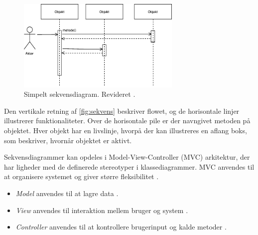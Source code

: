 \begin{figure} [H]
\centering
\includegraphics[width=0.7\textwidth]{figures/sekvens}
\caption{Simpelt sekvensdiagram. Revideret \cite{Brahma2015}.}
\label{fig:sekvens}
\end{figure}

\noindent
Den vertikale retning af \autoref{fig:sekvens} beskriver flowet, og de horisontale linjer illustrerer funktionaliteter. Over de horisontale pile er der navngivet metoden på objektet. Hver objekt har en livslinje, hvorpå der kan illustreres en aflang boks, som beskriver, hvornår objektet er aktivt. \cite{Brahma2015}

Sekvensdiagrammer kan opdeles i Model-View-Controller (MVC) arkitektur, der har ligheder med de definerede stereotyper i klassediagrammer. MVC anvendes til at organisere systemet og giver større fleksibilitet \cite{Brahma2015}. 

\begin{itemize}
\item \textit{Model} anvendes til at lagre data \cite{Brahma2015}.
\item \textit{View} anvendes til interaktion mellem bruger og system \cite{Brahma2015}.
\item \textit{Controller} anvendes til at kontrollere brugerinput og kalde metoder \cite{Brahma2015}.
\end{itemize}